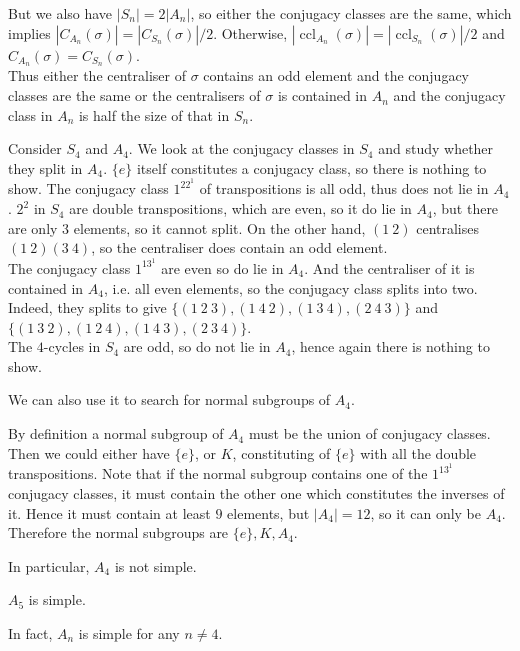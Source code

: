 But we also have $|S_n|=2|A_n|$, so either the conjugacy classes are the same, which implies $|C_{A_n}(\sigma)|=|C_{S_n}(\sigma)|/2$.
Otherwise, $|\operatorname{ccl}_{A_n}(\sigma)|=|\operatorname{ccl}_{S_n}(\sigma)|/2$ and $C_{A_n}(\sigma)=C_{S_n}(\sigma)$.\\
Thus either the centraliser of $\sigma$ contains an odd element and the conjugacy classes are the same or the centralisers of $\sigma$ is contained in $A_n$ and the conjugacy class in $A_n$ is half the size of that in $S_n$.
\begin{example}
    Consider $S_4$ and $A_4$.
    We look at the conjugacy classes in $S_4$ and study whether they split in $A_4$.
    $\{e\}$ itself constitutes a conjugacy class, so there is nothing to show.
    The conjugacy class $1^22^1$ of transpositions is all odd, thus does not lie in $A_4$.
    $2^2$ in $S_4$ are double transpositions, which are even, so it do lie in $A_4$, but there are only $3$ elements, so it cannot split.
    On the other hand, $(1\ 2)$ centralises $(1\ 2)(3\ 4)$, so the centraliser does contain an odd element.\\
    The conjugacy class $1^13^1$ are even so do lie in $A_4$.
    And the centraliser of it is contained in $A_4$, i.e. all even elements, so the conjugacy class splits into two.
    Indeed, they splits to give $\{(1\ 2\ 3),(1\ 4\ 2),(1\ 3\ 4),(2\ 4\ 3)\}$ and $\{(1\ 3\ 2),(1\ 2\ 4), (1\ 4\ 3),(2\ 3\ 4)\}$.\\
    The $4$-cycles in $S_4$ are odd, so do not lie in $A_4$, hence again there is nothing to show.
\end{example}
We can also use it to search for normal subgroups of $A_4$.
\begin{example}
    By definition a normal subgroup of $A_4$ must be the union of conjugacy classes.
    Then we could either have $\{e\}$, or $K$, constituting of $\{e\}$ with all the double transpositions.
    Note that if the normal subgroup contains one of the $1^13^1$ conjugacy classes, it must contain the other one which constitutes the inverses of it.
    Hence it must contain at least $9$ elements, but $|A_4|=12$, so it can only be $A_4$.
    Therefore the normal subgroups are $\{e\},K,A_4$.
\end{example}
In particular, $A_4$ is not simple.
\begin{theorem}
    $A_5$ is simple.
\end{theorem}
In fact, $A_n$ is simple for any $n\neq 4$.
